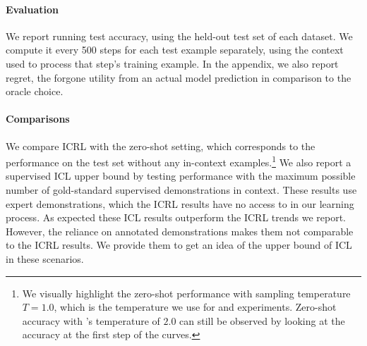 \paragraph{Evaluation} 

We report running test accuracy, using the held-out test set of each dataset. We compute it every 500 steps for each test example separately, using the context used to process that step's training example. In the appendix, we also report regret, the forgone utility from an actual model prediction in comparison to the oracle choice. 





\paragraph{Comparisons}

We compare ICRL with the zero-shot setting, which corresponds to the performance on the test set without any in-context examples.\footnote{We visually highlight the zero-shot performance with sampling temperature $T=1.0$, which is the temperature we use for \naiveshort and \expshort experiments. Zero-shot accuracy with \naiveplusshort's temperature of $2.0$ can still be observed by looking at the accuracy at the first step of the \naiveplusshort curves.} 
We also report a supervised ICL upper bound by testing performance with the maximum possible number of gold-standard supervised demonstrations in context.
These results use expert demonstrations, which the ICRL results have no access to in our learning process. 
As expected these ICL results outperform the ICRL trends we report. 
However, the reliance on annotated demonstrations makes them not comparable to the ICRL results. We provide them to get an idea of the upper bound of ICL in these scenarios. 


